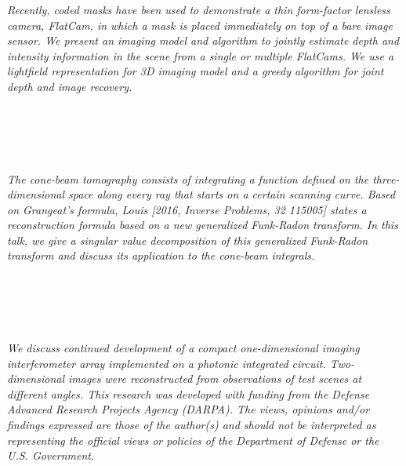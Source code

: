 \begin{multicols}{2}
\\ 
      \\
      \\\\
\\
    \textit{Recently, coded masks have been used to demonstrate a thin form-factor lensless camera, FlatCam, in which a mask is placed immediately on top of a bare image sensor. We present an imaging model and algorithm to jointly estimate depth and intensity information in the scene from a single or multiple FlatCams. We use a lightfield representation for 3D imaging model and a greedy algorithm for joint depth and image recovery. }\\
\\ 
      \\
      \\\\
\\
    \textit{The cone-beam tomography consists of integrating a function defined on the three-dimensional space along every ray that starts on a certain scanning curve. Based on Grangeat's formula, Louis [2016, Inverse Problems, 32 115005] states a reconstruction formula based on a new generalized Funk-Radon transform. In this talk, we give a singular value decomposition of this generalized Funk-Radon transform and discuss its application to the cone-beam integrals.}\\
\\ 
      \\
      \\\\
\\
    \textit{We discuss continued development of a compact one-dimensional imaging interferometer array implemented on a photonic integrated circuit. Two-dimensional images were reconstructed from observations of test scenes at different angles.
This research was developed with funding from the Defense Advanced Research Projects Agency (DARPA). The views, opinions and/or findings expressed are those of the author(s) and should not be interpreted as representing the official views or policies of the Department of Defense or the U.S. Government.}\\
\\ 
      \\
      \\\\

\end{multicols}
